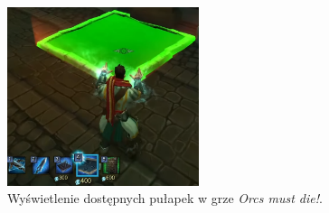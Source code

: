 \begin{figure}[h!tbp]
    \centering
    \includegraphics[width=0.5\textwidth]{images/ui/buoildingsOrcs.png}
    \caption[Wyświetlenie dostępnych pułapek w grze \textit{Orcs must die!}]{Wyświetlenie dostępnych pułapek w grze \textit{Orcs must die!}\protect\footnotemark.}\label{fig:Orcs}
\end{figure}
